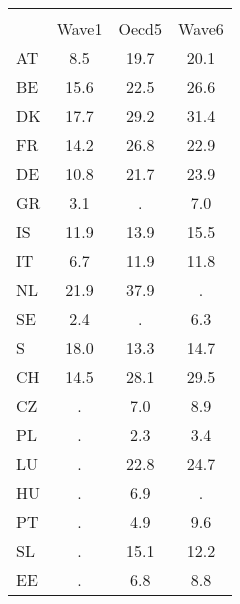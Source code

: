 {
\def\sym#1{\ifmmode^{#1}\else\(^{#1}\)\fi}
\begin{tabular}{l*{1}{ccc}}
\hline\hline
                    &\multicolumn{3}{c}{}                  \\
                    &       Wave1&       Oecd5&       Wave6\\
\hline
AT                  &         8.5&        19.7&        20.1\\
BE                  &        15.6&        22.5&        26.6\\
DK                  &        17.7&        29.2&        31.4\\
FR                  &        14.2&        26.8&        22.9\\
DE                  &        10.8&        21.7&        23.9\\
GR                  &         3.1&           .&         7.0\\
IS                  &        11.9&        13.9&        15.5\\
IT                  &         6.7&        11.9&        11.8\\
NL                  &        21.9&        37.9&           .\\
SE                  &         2.4&           .&         6.3\\
S                   &        18.0&        13.3&        14.7\\
CH                  &        14.5&        28.1&        29.5\\
CZ                  &           .&         7.0&         8.9\\
PL                  &           .&         2.3&         3.4\\
LU                  &           .&        22.8&        24.7\\
HU                  &           .&         6.9&           .\\
PT                  &           .&         4.9&         9.6\\
SL                  &           .&        15.1&        12.2\\
EE                  &           .&         6.8&         8.8\\
\hline\hline
\end{tabular}
}
